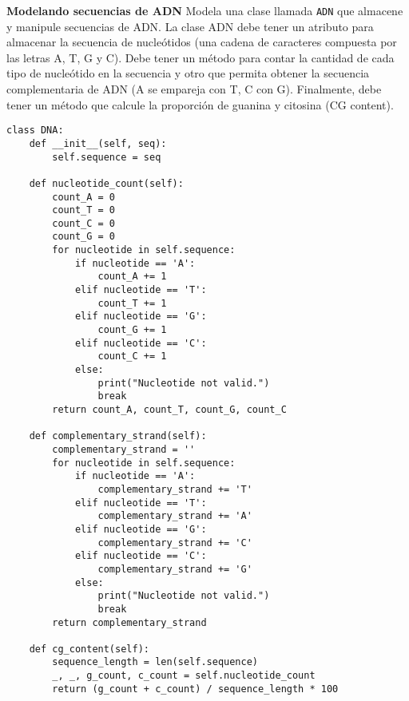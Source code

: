 \documentclass{config/ejercicios}
\begin{document}
\begin{problemS} \textbf{Modelando secuencias de ADN}
Modela una clase llamada \texttt{ADN} que almacene y manipule secuencias de ADN. La clase ADN debe tener un atributo para almacenar la secuencia de nucleótidos (una cadena de caracteres compuesta por las letras A, T, G y C). Debe tener un método para contar la cantidad de cada tipo de nucleótido en la secuencia y otro que permita obtener la secuencia complementaria de ADN (A se empareja con T, C con G). Finalmente, debe tener un método que calcule la proporción de guanina y citosina (CG content).
\begin{lstlisting}
class DNA:
    def __init__(self, seq):
        self.sequence = seq
    
    def nucleotide_count(self):
        count_A = 0
        count_T = 0
        count_C = 0
        count_G = 0
        for nucleotide in self.sequence:
            if nucleotide == 'A':
                count_A += 1
            elif nucleotide == 'T':
                count_T += 1
            elif nucleotide == 'G':
                count_G += 1
            elif nucleotide == 'C':
                count_C += 1
            else:
                print("Nucleotide not valid.")
                break
        return count_A, count_T, count_G, count_C
        
    def complementary_strand(self):
        complementary_strand = ''
        for nucleotide in self.sequence:
            if nucleotide == 'A':
                complementary_strand += 'T'
            elif nucleotide == 'T':
                complementary_strand += 'A'
            elif nucleotide == 'G':
                complementary_strand += 'C'
            elif nucleotide == 'C':
                complementary_strand += 'G'
            else:
                print("Nucleotide not valid.")
                break
        return complementary_strand
    
    def cg_content(self):
        sequence_length = len(self.sequence)
        _, _, g_count, c_count = self.nucleotide_count
        return (g_count + c_count) / sequence_length * 100
\end{lstlisting}
\end{problemS}
\end{document}
